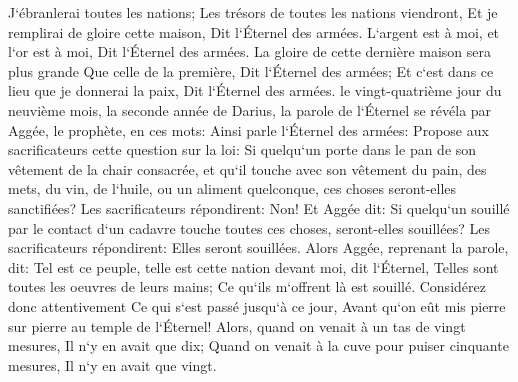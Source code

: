 \verse J`ébranlerai toutes les nations; Les trésors de toutes les nations viendront, Et je remplirai de gloire cette maison, Dit l`Éternel des armées. 
\verse L`argent est à moi, et l`or est à moi, Dit l`Éternel des armées. 
\verse La gloire de cette dernière maison sera plus grande Que celle de la première, Dit l`Éternel des armées; Et c`est dans ce lieu que je donnerai la paix, Dit l`Éternel des armées. 
\verse le vingt-quatrième jour du neuvième mois, la seconde année de Darius, la parole de l`Éternel se révéla par Aggée, le prophète, en ces mots: 
\verse Ainsi parle l`Éternel des armées: Propose aux sacrificateurs cette question sur la loi: 
\verse Si quelqu`un porte dans le pan de son vêtement de la chair consacrée, et qu`il touche avec son vêtement du pain, des mets, du vin, de l`huile, ou un aliment quelconque, ces choses seront-elles sanctifiées? Les sacrificateurs répondirent: Non! 
\verse Et Aggée dit: Si quelqu`un souillé par le contact d`un cadavre touche toutes ces choses, seront-elles souillées? Les sacrificateurs répondirent: Elles seront souillées. 
\verse Alors Aggée, reprenant la parole, dit: Tel est ce peuple, telle est cette nation devant moi, dit l`Éternel, Telles sont toutes les oeuvres de leurs mains; Ce qu`ils m`offrent là est souillé. 
\verse Considérez donc attentivement Ce qui s`est passé jusqu`à ce jour, Avant qu`on eût mis pierre sur pierre au temple de l`Éternel! 
\verse Alors, quand on venait à un tas de vingt mesures, Il n`y en avait que dix; Quand on venait à la cuve pour puiser cinquante mesures, Il n`y en avait que vingt. 
